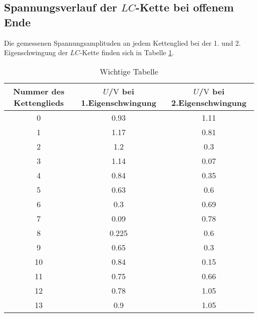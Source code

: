 \subsection{Spannungsverlauf der $LC$-Kette bei offenem Ende}
Die gemessenen Spannungsamplituden an jedem Kettenglied bei der 1. und 2. Eigenschwingung der $LC$-Kette finden sich in Tabelle \ref{tab:ei}.

\begin{table}
   \centering
\caption{Wichtige Tabelle}
\label{tab:ei}
\begin{tabular}{ccc}
  \toprule
Nummer des Kettenglieds & $U$/$\si{\volt}$ bei 1.Eigenschwingung & $U$/$\si{\volt}$ bei 2.Eigenschwingung \\
\midrule
0 & 0.93 & 1.11 \\
1 & 1.17 & 0.81 \\
2 & 1.2 & 0.3 \\
3 & 1.14 & 0.07 \\
4 & 0.84 & 0.35 \\
5 & 0.63 & 0.6 \\
6 & 0.3 & 0.69 \\
7 & 0.09 & 0.78 \\
8 & 0.225 & 0.6 \\
9 & 0.65 & 0.3 \\
10 & 0.84 & 0.15 \\
11 & 0.75 & 0.66 \\
12 & 0.78 & 1.05 \\
13 & 0.9 & 1.05 \\
\bottomrule
\end{tabular}
\end{table}

